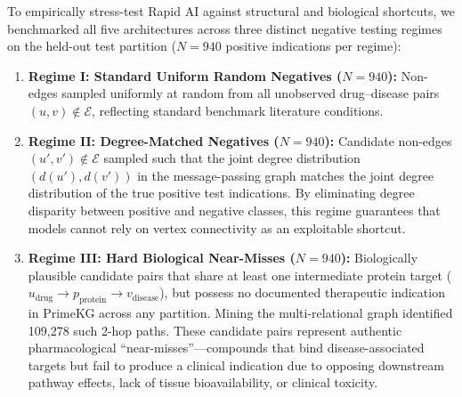 \documentclass[conference,a4paper]{IEEEtran}
\begin{document}
To empirically stress-test Rapid AI against structural and biological shortcuts, we benchmarked all five architectures across three distinct negative testing regimes on the held-out test partition ($N = 940$ positive indications per regime):
\begin{enumerate}
    \item \textbf{Regime I: Standard Uniform Random Negatives ($N = 940$):} Non-edges sampled uniformly at random from all unobserved drug--disease pairs $(u, v) \notin \mathcal{E}$, reflecting standard benchmark literature conditions.
    \item \textbf{Regime II: Degree-Matched Negatives ($N = 940$):} Candidate non-edges $(u', v') \notin \mathcal{E}$ sampled such that the joint degree distribution $(d(u'), d(v'))$ in the message-passing graph matches the joint degree distribution of the true positive test indications. By eliminating degree disparity between positive and negative classes, this regime guarantees that models cannot rely on vertex connectivity as an exploitable shortcut.
    \item \textbf{Regime III: Hard Biological Near-Misses ($N = 940$):} Biologically plausible candidate pairs that share at least one intermediate protein target ($u_{\text{drug}} \to p_{\text{protein}} \to v_{\text{disease}}$), but possess no documented therapeutic indication in PrimeKG across any partition. Mining the multi-relational graph identified 109,278 such 2-hop paths. These candidate pairs represent authentic pharmacological ``near-misses''—compounds that bind disease-associated targets but fail to produce a clinical indication due to opposing downstream pathway effects, lack of tissue bioavailability, or clinical toxicity.
\end{enumerate}
\end{document}
